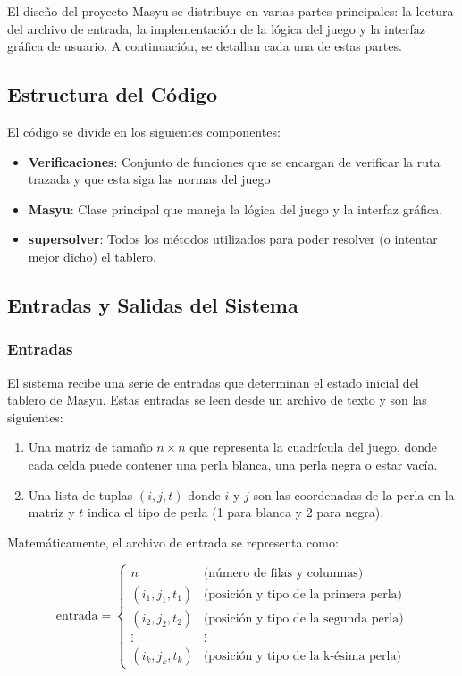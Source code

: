 \documentclass{article}
\begin{document}
El diseño del proyecto Masyu se distribuye en varias partes principales: la lectura del archivo de entrada, la implementación de la lógica del juego y la interfaz gráfica de usuario. A continuación, se detallan cada una de estas partes.

\subsection{Estructura del Código}

El código se divide en los siguientes componentes:

\begin{itemize}
    \item \textbf{Verificaciones}: Conjunto de funciones que se encargan de verificar la ruta trazada y que esta siga las normas del juego
    \item \textbf{Masyu}: Clase principal que maneja la lógica del juego y la interfaz gráfica.
    \item \textbf{supersolver}: Todos los métodos utilizados para poder resolver (o intentar mejor dicho) el tablero.
\end{itemize}

\subsection{Entradas y Salidas del Sistema}

\subsubsection{Entradas}

El sistema recibe una serie de entradas que determinan el estado inicial del tablero de Masyu. Estas entradas se leen desde un archivo de texto y son las siguientes:

\begin{enumerate}
    \item Una matriz de tamaño \( n \times n \) que representa la cuadrícula del juego, donde cada celda puede contener una perla blanca, una perla negra o estar vacía.
    \item Una lista de tuplas \((i, j, t)\) donde \( i \) y \( j \) son las coordenadas de la perla en la matriz y \( t \) indica el tipo de perla (1 para blanca y 2 para negra).
\end{enumerate}

Matemáticamente, el archivo de entrada se representa como:

\[
\text{entrada} = \begin{cases}
n & \text{(número de filas y columnas)} \\
(i_1, j_1, t_1) & \text{(posición y tipo de la primera perla)} \\
(i_2, j_2, t_2) & \text{(posición y tipo de la segunda perla)} \\
\vdots & \vdots \\
(i_k, j_k, t_k) & \text{(posición y tipo de la k-ésima perla)}
\end{cases}
\]
\end{document}
